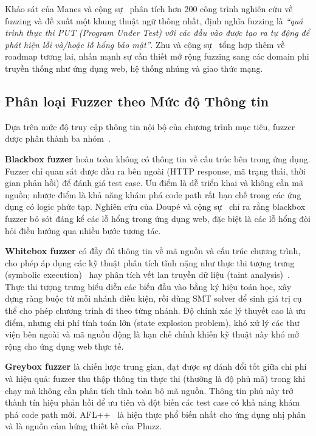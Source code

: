 Khảo sát của Manes và cộng sự~\cite{manes2021art} phân tích hơn 200 công
trình nghiên cứu về fuzzing và đề xuất một khung thuật ngữ thống nhất, định
nghĩa fuzzing là \textit{``quá trình thực thi PUT (Program Under Test) với
các đầu vào được tạo ra tự động để phát hiện lỗi và/hoặc lỗ hổng bảo mật''}.
Zhu và cộng sự~\cite{zhu2022fuzzing} tổng hợp thêm về roadmap tương lai,
nhấn mạnh sự cần thiết mở rộng fuzzing sang các domain phi truyền thống như
ứng dụng web, hệ thống nhúng và giao thức mạng.

\subsection{Phân loại Fuzzer theo Mức độ Thông tin}

Dựa trên mức độ truy cập thông tin nội bộ của chương trình mục tiêu, fuzzer
được phân thành ba nhóm~\cite{godefroid2007random, li2018fuzzing, zhu2022fuzzing}.

\textbf{Blackbox fuzzer} hoàn toàn không có thông tin về cấu trúc bên trong
ứng dụng. Fuzzer chỉ quan sát được đầu ra bên ngoài (HTTP response, mã trạng
thái, thời gian phản hồi) để đánh giá test case. Ưu điểm là dễ triển khai và
không cần mã nguồn; nhược điểm là khả năng khám phá code path rất hạn chế
trong các ứng dụng có logic phức tạp. Nghiên cứu của Doupé và cộng
sự~\cite{doupe2010johnny} chỉ ra rằng blackbox fuzzer bỏ sót đáng kể các lỗ
hổng trong ứng dụng web, đặc biệt là các lỗ hổng đòi hỏi điều hướng qua
nhiều bước tương tác.

\textbf{Whitebox fuzzer} có đầy đủ thông tin về mã nguồn và cấu trúc chương
trình, cho phép áp dụng các kỹ thuật phân tích tĩnh nặng như thực thi tượng
trưng (symbolic execution)~\cite{godefroid2008automated} hay phân tích vết
lan truyền dữ liệu (taint analysis)~\cite{ganesh2009taint}. Thực thi tượng
trưng biểu diễn các biến đầu vào bằng ký hiệu toán học, xây dựng ràng buộc
từ mỗi nhánh điều kiện, rồi dùng SMT solver để sinh giá trị cụ thể cho phép
chương trình đi theo từng nhánh. Độ chính xác lý thuyết cao là ưu điểm,
nhưng chi phí tính toán lớn (state explosion problem), khó xử lý các thư viện
bên ngoài và mã nguồn động là hạn chế chính khiến kỹ thuật này khó mở rộng
cho ứng dụng web thực tế.

\textbf{Greybox fuzzer} là chiến lược trung gian, đạt được sự đánh đổi tốt
giữa chi phí và hiệu quả: fuzzer thu thập thông tin thực thi (thường là độ
phủ mã) trong khi chạy mà không cần phân tích tĩnh toàn bộ mã nguồn. Thông
tin phủ này trở thành tín hiệu phản hồi để ưu tiên và đột biến các test case
có khả năng khám phá code path mới. AFL++~\cite{fioraldi2020afl} là hiện thực
phổ biến nhất cho ứng dụng nhị phân và là nguồn cảm hứng thiết kế của Phuzz.

